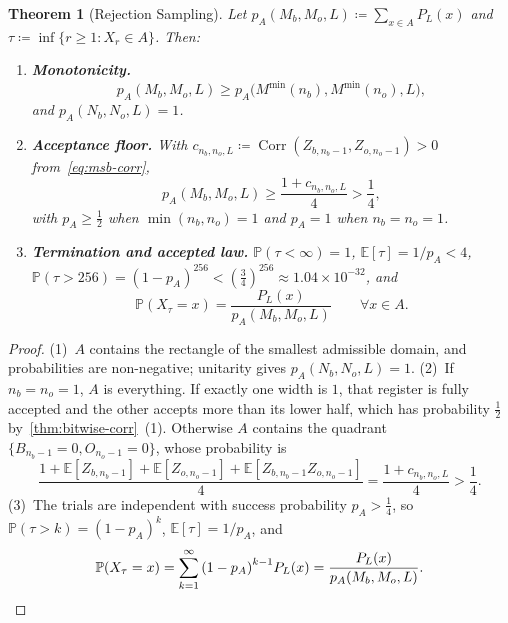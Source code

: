 \documentclass[11pt,a4paper]{article}
\theoremstyle{plain}
\newtheorem{theorem}{Theorem}[section]
\theoremstyle{definition}
\theoremstyle{remark}
\newcommand{\Prob}{\mathbb{P}}
\newcommand{\Exp}{\mathbb{E}}
\newcommand{\Corr}{\operatorname{Corr}}
\begin{document}
\begin{theorem}[Rejection Sampling]\label{thm:rejection}
  Let \( p_A(M_b, M_o, L) \coloneqq \sum_{x \in A} P_L(x) \) and
  \( \tau \coloneqq \inf \{r \ge 1 : X_r \in A\} \). Then:
  \begin{enumerate}
    \item \textbf{Monotonicity.}
      \begin{equation}\label{eq:monotonicity}
        p_A(M_b, M_o, L) \ge p_A\big(M^{\min}(n_b), M^{\min}(n_o), L\big),
      \end{equation}
      and \( p_A(N_b, N_o, L) = 1 \).
    \item \textbf{Acceptance floor.} With \( c_{n_b, n_o, L} \coloneqq
      \Corr(Z_{b, n_b - 1}, Z_{o, n_o - 1}) > 0 \) from~\eqref{eq:msb-corr},
      \begin{equation}\label{eq:analytic-floor}
        p_A(M_b, M_o, L) \ge \frac{1 + c_{n_b, n_o, L}}{4} > \frac{1}{4},
      \end{equation}
      with \( p_A \ge \frac{1}{2} \) when \( \min(n_b, n_o) = 1 \) and \( p_A = 1 \) when
      \( n_b = n_o = 1 \).
    \item \textbf{Termination and accepted law.} \( \Prob(\tau < \infty) = 1 \),
      \( \Exp[\tau] = 1 / p_A < 4 \),
      \( \Prob(\tau > 256) = {(1 - p_A)}^{256} < {\left(\frac{3}{4}\right)}^{256} \approx
      1.04 \times 10^{-32} \), and
      \begin{equation}\label{eq:cond-law}
        \Prob(X_\tau = x) = \frac{P_L(x)}{p_A(M_b, M_o, L)} \qquad \forall x \in A.
      \end{equation}
  \end{enumerate}
\end{theorem}
\begin{proof}
  (1)~\( A \) contains the rectangle of the smallest admissible domain, and probabilities are
  non-negative; unitarity gives \( p_A(N_b, N_o, L) = 1 \).
  (2)~If \( n_b = n_o = 1 \), \( A \) is everything. If exactly one width is \( 1 \), that register
  is fully accepted and the other accepts more than its lower half, which has probability
  \( \frac{1}{2} \) by~\cref{thm:bitwise-corr}~(1). Otherwise \( A \) contains the quadrant
  \( \{B_{n_b - 1} = 0, O_{n_o - 1} = 0\} \), whose probability is
  \[
    \frac{1 + \Exp[Z_{b, n_b - 1}] + \Exp[Z_{o, n_o - 1}] +
    \Exp[Z_{b, n_b - 1} Z_{o, n_o - 1}]}{4} = \frac{1 + c_{n_b, n_o, L}}{4} > \frac{1}{4}.
  \]
  (3)~The trials are independent with success probability \( p_A > \frac{1}{4} \), so
  \( \Prob(\tau > k) = {(1 - p_A)}^k \), \( \Exp[\tau] = 1 / p_A \), and
  \[
    \Prob(X_\tau = x) = \sum_{k=1}^\infty {(1 - p_A)}^{k-1} P_L(x) =
    \frac{P_L(x)}{p_A(M_b, M_o, L)}. \qedhere
  \]
\end{proof}
\end{document}
